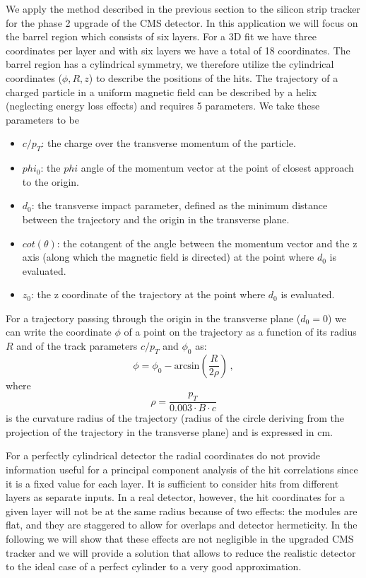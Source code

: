 \documentclass[10pt,a4paper]{report}
\begin{document}
We apply the method described in the previous section to the silicon strip tracker for the phase 2 upgrade of the CMS detector. In this application we will focus on the barrel region which consists of six layers. For a 3D fit we have three coordinates per layer and with six layers we have a total of 18 coordinates. The barrel region has a cylindrical symmetry, we therefore utilize the cylindrical coordinates ($\phi, R, z$) to describe the positions of the hits. The trajectory of a charged particle in a uniform magnetic field can be described by a helix (neglecting energy loss effects) and requires 5 parameters. We take these parameters to be
\begin{itemize}
\item $c/p_T$: the charge over the transverse momentum of the particle.
\item $phi_0$: the $phi$ angle of the momentum vector at the point of closest approach to the origin.
\item $d_0$: the transverse impact parameter, defined as the minimum distance between the trajectory and the origin in the transverse plane.
\item $cot(\theta)$: the cotangent of the angle between the momentum vector and the z axis (along which the magnetic field is directed) at the point where $d_0$ is evaluated.
\item $z_0$: the z coordinate of the trajectory at the point where $d_0$ is evaluated.
\end{itemize}
For a trajectory passing through the origin in the transverse plane ($d_0 = 0$) we can write the coordinate $\phi$ of a point on the trajectory as a function of its radius $R$ and of the track parameters $c/p_T$ and $\phi_0$ as:
\begin{equation}
\phi = \phi_0 - \mbox{arcsin}\left(\frac{R}{2\rho}\right)\, ,
\label{eq:trajectoryPhi}
\end{equation}
where
\begin{equation}
\rho = \frac{p_T}{0.003\cdot B\cdot c}
\end{equation}
is the curvature radius of the trajectory (radius of the circle deriving from the projection of the trajectory in the transverse plane) and is expressed in cm.

For a perfectly cylindrical detector the radial coordinates do not provide information useful for a principal component analysis of the hit correlations since it is a fixed value for each layer. It is sufficient to consider hits from different layers as separate inputs. In a real detector, however, the hit coordinates for a given layer will not be at the same radius because of two effects: the modules are flat, and they are staggered to allow for overlaps and detector hermeticity. In the following we will show that these effects are not negligible in the upgraded CMS tracker and we will provide a solution that allows to reduce the realistic detector to the ideal case of a perfect cylinder to a very good approximation.
\end{document}
